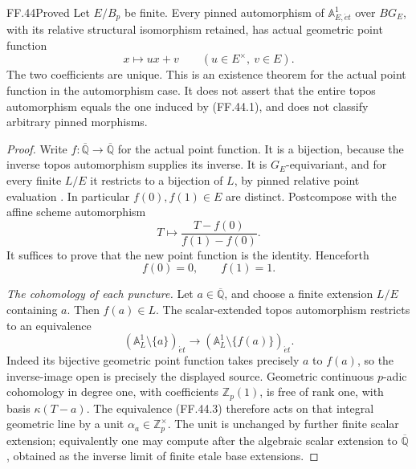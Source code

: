 \begin{claim}{FF.44}{Proved}\label{clm:FFmetabelianaffine}
Let \(E/B_p\) be finite. Every
pinned automorphism of
\(\mathbb A^1_{E,\acute et}\) over
\(BG_E\), with its relative
structural isomorphism retained,
has actual geometric point function
\[
                          x\longmapsto ux+v
                          \qquad
                          (u\in E^\times,\ v\in E).
                                                        \tag{FF.44.1}
\]
The two coefficients are unique.
This is an existence theorem for
the actual point function in the
automorphism case. It does not
assert that the entire topos
automorphism equals the one induced
by (FF.44.1), and does not classify
arbitrary pinned morphisms.
\end{claim}
\begin{proof}
Write \(f:\overline{\mathbb Q}
\to\overline{\mathbb Q}\) for
the actual point function. It is
a bijection, because the inverse
topos automorphism supplies its
inverse. It is \(G_E\)-equivariant,
and for every finite \(L/E\)
it restricts to a bijection of
\(L\), by pinned relative point
evaluation \citep[Proposition~3.6]{FF_CHW2024}.
In particular \(f(0),f(1)\in E\)
are distinct. Postcompose with
the affine scheme automorphism
\[
                   T\longmapsto
                   \frac{T-f(0)}{f(1)-f(0)}.
\]
It suffices to prove that the
new point function is the identity.
Henceforth
\[
                            f(0)=0,\qquad f(1)=1.
                                                        \tag{FF.44.2}
\]

\emph{The cohomology of each puncture.}
Let \(a\in\overline{\mathbb Q}\),
and choose a finite extension
\(L/E\) containing \(a\). Then
\(f(a)\in L\). The scalar-extended
topos automorphism restricts to an
equivalence
\[
 (\mathbb A^1_L\setminus\{a\})_{\acute et}
       \longrightarrow
 (\mathbb A^1_L\setminus\{f(a)\})_{\acute et}.
                                                        \tag{FF.44.3}
\]
Indeed its bijective geometric point
function takes precisely \(a\)
to \(f(a)\), so the inverse-image
open is precisely the displayed
source. Geometric continuous
\(p\)-adic cohomology in degree
one, with coefficients
\(\mathbb Z_p(1)\), is free of
rank one, with basis
\(\kappa(T-a)\). The equivalence
(FF.44.3) therefore acts on that
integral geometric line by a unit
\(\alpha_a\in\mathbb Z_p^\times\).
The unit is unchanged by further
finite scalar extension; equivalently
one may compute after the algebraic
scalar extension to
\(\overline{\mathbb Q}\), obtained
as the inverse limit of finite
etale base extensions.


\end{proof}
